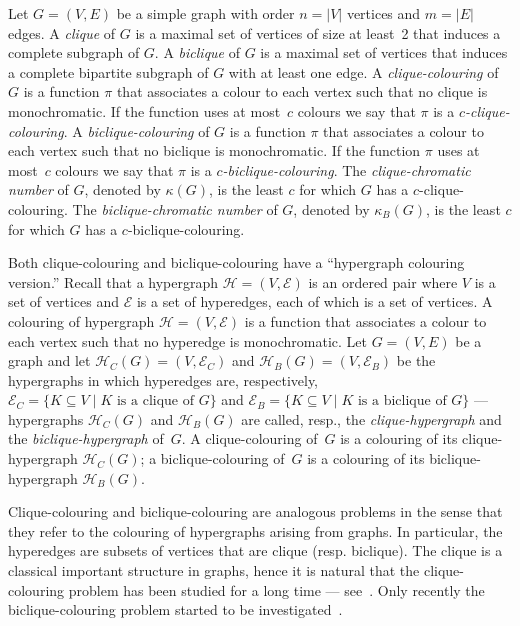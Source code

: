 \documentclass{article}
\begin{document}
Let $G=(V,E)$ be a simple graph with order $n=|V|$ vertices and
$m=|E|$ edges.
A \emph{clique} of $G$ is a maximal set of vertices of size at least~2 that
induces a complete subgraph of $G$.
A \emph{biclique} of $G$ is a maximal set of vertices that induces a complete
bipartite subgraph of $G$ with at least one edge.
A \emph{clique-colouring} of~$G$ is a function $\pi$ that associates a colour to
each vertex such that no clique is monochromatic. If the function uses at
most~$c$ colours we say that $\pi$ is a \emph{$c$-clique-colouring}.
A \emph{biclique-colouring} of $G$ is a function $\pi$ that associates a colour
to each vertex such that no biclique is monochromatic. If the function $\pi$
uses at most~$c$ colours we say that $\pi$ is a \emph{$c$-biclique-colouring}.
The \emph{clique-chromatic number} of $G$, denoted by $\kappa(G)$, is the least
$c$ for which $G$ has a $c$-clique-colouring. The \emph{biclique-chromatic
number} of $G$, denoted by $\kappa_B(G)$, is the least $c$ for which $G$ has a
$c$-biclique-colouring.

Both clique-colouring and biclique-colouring have a ``hypergraph colouring
version.'' Recall that a hypergraph $\mathcal{H}=(V,\mathcal{E})$ is an ordered
pair where $V$ is a set of vertices and $\mathcal{E}$ is a set of hyperedges,
each of which is a set of vertices. A colouring of hypergraph
$\mathcal{H}=(V,\mathcal{E})$ is a function that associates a colour to each
vertex such that no hyperedge is monochromatic. Let $G=(V,E)$ be a graph and let
$\mathcal{H}_C(G)=(V,\mathcal{E}_C)$ and $\mathcal{H}_B(G)=(V,\mathcal{E}_B)$
be the hypergraphs in which hyperedges are, respectively, $\mathcal{E}_C=\{K \subseteq
V\mid K \mbox{ is a clique of } G\}$ and $\mathcal{E}_B=\{K \subseteq V\mid
K \mbox{ is a biclique of } G\}$ --- hypergraphs $\mathcal{H}_C(G)$ and
$\mathcal{H}_B(G)$ are called, resp., the \emph{clique-hypergraph} and the
\emph{biclique-hypergraph} of~$G$. A clique-colouring of~$G$ is a colouring of
its clique-hypergraph $\mathcal{H}_C(G)$; a biclique-colouring of~$G$ is a
colouring of its biclique-hypergraph $\mathcal{H}_B(G)$.


Clique-colouring and biclique-colouring are analogous problems in the sense that
they refer to the colouring of hypergraphs arising from graphs.
In particular, the hyperedges are subsets of vertices that are clique (resp. biclique).
The clique is a classical important
structure in graphs, hence it is natural that the clique-colouring problem has
been studied for a long time ---
see~\cite{Bacso,Defossez,Kratochvil,DanielMarx}. 
Only recently the biclique-colouring problem started to be
investigated~\cite{1210.7269}. 
\end{document}
